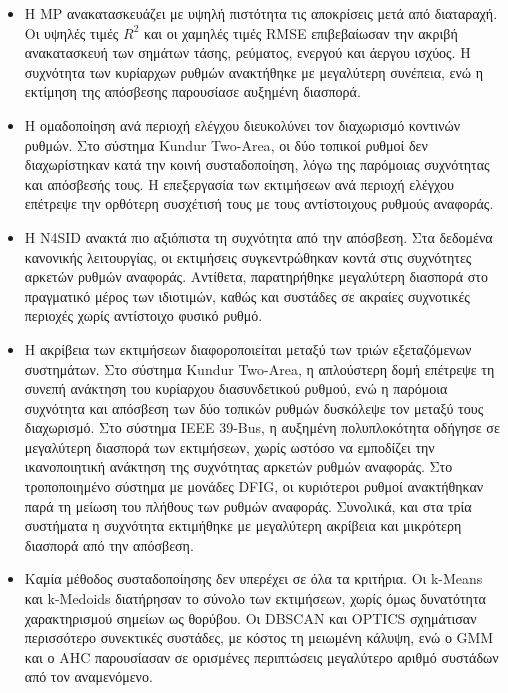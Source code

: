 \begin{itemize}
    \item Η MP ανακατασκευάζει με υψηλή πιστότητα τις αποκρίσεις
    μετά από διαταραχή. Οι υψηλές τιμές $R^2$ και οι χαμηλές τιμές RMSE
    επιβεβαίωσαν την ακριβή ανακατασκευή των σημάτων τάσης, ρεύματος, ενεργού
    και άεργου ισχύος. Η συχνότητα των κυρίαρχων ρυθμών ανακτήθηκε με
    μεγαλύτερη συνέπεια, ενώ η εκτίμηση της απόσβεσης παρουσίασε αυξημένη
    διασπορά.

    \item Η ομαδοποίηση ανά περιοχή ελέγχου διευκολύνει τον
    διαχωρισμό κοντινών ρυθμών. Στο σύστημα \textenglish{Kundur Two-Area},
    οι δύο τοπικοί ρυθμοί δεν διαχωρίστηκαν κατά την κοινή συσταδοποίηση,
    λόγω της παρόμοιας συχνότητας και απόσβεσής τους. Η επεξεργασία των
    εκτιμήσεων ανά περιοχή ελέγχου επέτρεψε την ορθότερη συσχέτισή τους με
    τους αντίστοιχους ρυθμούς αναφοράς.

    \item Η N4SID ανακτά πιο αξιόπιστα τη συχνότητα από την
    απόσβεση. Στα δεδομένα κανονικής λειτουργίας, οι εκτιμήσεις
    συγκεντρώθηκαν κοντά στις συχνότητες αρκετών ρυθμών αναφοράς. Αντίθετα,
    παρατηρήθηκε μεγαλύτερη διασπορά στο πραγματικό μέρος των ιδιοτιμών,
    καθώς και συστάδες σε ακραίες συχνοτικές περιοχές χωρίς αντίστοιχο
    φυσικό ρυθμό.

    \item Η ακρίβεια των εκτιμήσεων διαφοροποιείται μεταξύ των τριών
    εξεταζόμενων συστημάτων. Στο σύστημα \textenglish{Kundur Two-Area}, η
    απλούστερη δομή επέτρεψε τη συνεπή ανάκτηση του κυρίαρχου
    διασυνδετικού ρυθμού, ενώ η παρόμοια συχνότητα και απόσβεση των δύο
    τοπικών ρυθμών δυσκόλεψε τον μεταξύ τους διαχωρισμό. Στο 
    σύστημα \textenglish{IEEE 39-Bus}, η αυξημένη πολυπλοκότητα οδήγησε σε
    μεγαλύτερη διασπορά των εκτιμήσεων, χωρίς ωστόσο να εμποδίζει την
    ικανοποιητική ανάκτηση της συχνότητας αρκετών ρυθμών αναφοράς. Στο
    τροποποιημένο σύστημα με μονάδες DFIG, οι κυριότεροι ρυθμοί ανακτήθηκαν
    παρά τη μείωση του πλήθους των ρυθμών αναφοράς. Συνολικά, και στα τρία συστήματα η συχνότητα
    εκτιμήθηκε με μεγαλύτερη ακρίβεια και μικρότερη διασπορά από την
    απόσβεση.

    \item Καμία μέθοδος συσταδοποίησης δεν υπερέχει σε όλα τα
    κριτήρια. Οι \textenglish{k-Means} και \textenglish{k-Medoids}
    διατήρησαν το σύνολο των εκτιμήσεων, χωρίς όμως δυνατότητα χαρακτηρισμού
    σημείων ως θορύβου. Οι DBSCAN και OPTICS σχημάτισαν περισσότερο συνεκτικές
    συστάδες, με κόστος τη μειωμένη κάλυψη, ενώ ο GMM και ο AHC παρουσίασαν
    σε ορισμένες περιπτώσεις μεγαλύτερο αριθμό συστάδων από τον αναμενόμενο.


\end{itemize}
